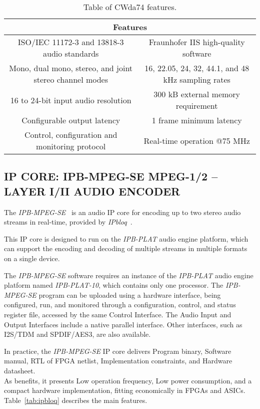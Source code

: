 \begin{table}[h]
    \centering
    \begin{tabular}{|c|c|}
        \hline
        \multicolumn{2}{|c|}{\textbf{Features}} \\
        \hline
         ISO/IEC 11172-3 and 13818-3 audio standards & Fraunhofer IIS high-quality software \\
         \hline
         Mono, dual mono, stereo, and joint stereo channel modes & 16, 22.05, 24, 32, 44.1, and 48 kHz sampling rates \\
         \hline
         16 to 24-bit input audio resolution & 300 kB external memory requirement\\
         \hline
         Configurable output latency & 1 frame minimum latency\\
         \hline
         Control, configuration and monitoring protocol & Real-time operation @75 MHz \\
         \hline
    \end{tabular}
    \caption{Table of CWda74 features.}
    \label{tab:coreworks}
\end{table}

\subsection{IP CORE: IPB-MPEG-SE MPEG-1/2 – LAYER I/II AUDIO ENCODER}

The \textit{IPB-MPEG-SE}~\cite{ipb-mpeg-se} is an audio IP core for encoding up to two stereo audio streams in real-time, provided by \textit{IPbloq}~\cite{ipbloq}.

This IP core is designed to run on the \textit{IPB-PLAT} audio engine platform, which can support the encoding and decoding of multiple streams in multiple formats on a single device.

The \textit{IPB-MPEG-SE} software requires an instance of the \textit{IPB-PLAT} audio engine platform named \textit{IPB-PLAT-10}, which contains only one processor. 
The \textit{IPB-MPEG-SE} program can be uploaded using a hardware interface, being configured, run, and monitored through a configuration, control, and status register file, accessed by the same Control Interface.
The Audio Input and Output Interfaces include a native parallel interface. Other interfaces, such as I2S/TDM and SPDIF/AES3, are also available.

In practice, the \textit{IPB-MPEG-SE} IP core delivers Program binary, Software manual, RTL of FPGA netlist, Implementation constraints, and Hardware datasheet.\\
As benefits, it presents Low operation frequency, Low power consumption, and a compact hardware implementation, fitting economically in FPGAs and ASICs.
Table~\ref{tab:ipbloq} describes the main features.

